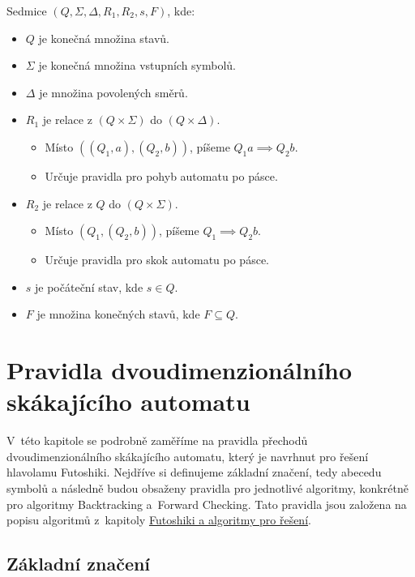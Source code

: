 Sedmice \((Q, \Sigma, \Delta, R_1, R_2, s, F)\), kde:
\begin{itemize}
    \item \(Q\) je konečná množina stavů.
    \item \(\Sigma\) je konečná množina vstupních symbolů.
    \item \(\Delta\) je množina povolených směrů.
    \item \(R_1\) je relace z \((Q \times \Sigma)\) do \((Q \times \Delta)\).
    \begin{itemize}
        \item Místo \(((Q_1, a), (Q_2, b))\), píšeme \(Q_1a \implies Q_2b\).
        \item Určuje pravidla pro pohyb automatu po pásce.
    \end{itemize}
    \item \(R_2\) je relace z \(Q\) do \((Q \times \Sigma)\).
    \begin{itemize}
        \item Místo \((Q_1, (Q_2, b))\), píšeme \(Q_1 \implies Q_2b\).
        \item Určuje pravidla pro skok automatu po pásce.
    \end{itemize}
    \item \(s\) je počáteční stav, kde \(s \in Q\).
    \item \(F\) je množina konečných stavů, kde \(F \subseteq Q\).
\end{itemize}

\chapter{Pravidla dvoudimenzionálního skákajícího automatu}

V~této kapitole se podrobně zaměříme na pravidla přechodů dvoudimenzionálního
skákajícího automatu, který je navrhnut pro řešení hlavolamu Futoshiki.
Nejdříve si definujeme základní značení, tedy abecedu symbolů a následně budou
obsaženy pravidla pro jednotlivé algoritmy, konkrétně pro algoritmy
Backtracking a~Forward Checking. Tato pravidla jsou založena na popisu
algoritmů z~kapitoly
\hyperref[sec:futoshikiAlgs]{Futoshiki a algoritmy pro řešení}.

\section{Základní značení}

